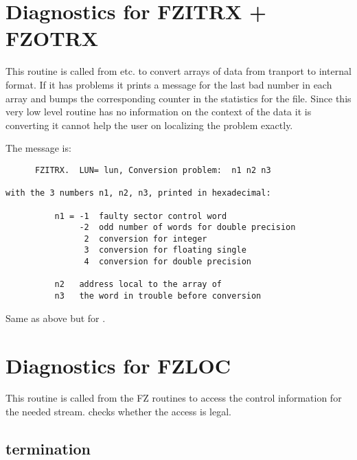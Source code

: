 \section{Diagnostics for FZITRX + FZOTRX}


This routine is called from  etc. to convert arrays of data
from tranport to internal format.
If it has problems it prints a message for the last bad number
in each array and bumps the corresponding counter in the
statistics for the file. Since this very low level routine
has no information  on the context of the data it is converting
it cannot help the user on localizing the problem exactly.

The message is:

\begin{verbatim}
      FZITRX.  LUN= lun, Conversion problem:  n1 n2 n3

with the 3 numbers n1, n2, n3, printed in hexadecimal:

          n1 = -1  faulty sector control word
               -2  odd number of words for double precision
                2  conversion for integer
                3  conversion for floating single
                4  conversion for double precision

          n2   address local to the array of
          n3   the word in trouble before conversion
\end{verbatim}


Same as above but for .

\section{Diagnostics for FZLOC}


This routine is called from the FZ routines to access the control
information for the needed stream.
 checks whether the access is legal.

\subsection*{ termination}

